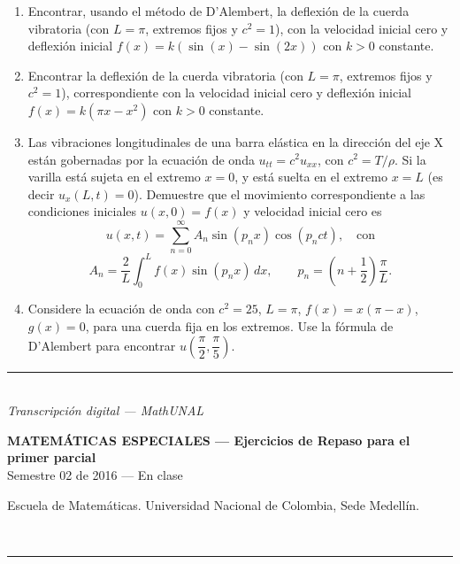 \documentclass[11pt]{article}
\newcommand{\examheader}[2]{%
  \noindent
  \begin{minipage}[t]{0.6\linewidth}
    {\small\bfseries MATEM\'ATICAS ESPECIALES --- #1}\\
    {\small #2}
  \end{minipage}%
  \hfill
  \begin{minipage}[t]{0.35\linewidth}
    \raggedleft\small Escuela de Matem\'aticas. Universidad Nacional de Colombia, Sede Medell\'in.
  \end{minipage}\\[2pt]
  \rule{\linewidth}{0.6pt}
}
\newcommand{\examfooter}{%
  \vfill
  \rule{\linewidth}{0.4pt}\\[1pt]
  {\scriptsize\textit{Transcripci\'on digital --- MathUNAL}\hfill\textcolor{unalblue}{\textbf{\thepage}}}
}
\begin{document}
\begin{enumerate}
\item Encontrar, usando el método de D'Alembert, la deflexión de la cuerda vibratoria (con $L=\pi$, extremos fijos y $c^2=1$), con la velocidad inicial cero y deflexión inicial $f(x) = k(\sin(x) - \sin(2x))$ con $k>0$ constante.

\item Encontrar la deflexión de la cuerda vibratoria (con $L=\pi$, extremos fijos y $c^2=1$), correspondiente con la velocidad inicial cero y deflexión inicial $f(x) = k(\pi x - x^2)$ con $k>0$ constante.

\item Las vibraciones longitudinales de una barra elástica en la dirección del eje X están gobernadas por la ecuación de onda $u_{tt} = c^2 u_{xx}$, con $c^2 = T/\rho$. Si la varilla está sujeta en el extremo $x=0$, y está suelta en el extremo $x=L$ (es decir $u_x(L,t)=0$). Demuestre que el movimiento correspondiente a las condiciones iniciales $u(x,0)=f(x)$ y velocidad inicial cero es
\[
u(x,t) = \sum_{n=0}^{\infty} A_n \sin(p_n x)\cos(p_n c t), \quad \text{con}
\]
\[
A_n = \frac{2}{L}\int_0^L f(x)\sin(p_n x)\,dx, \qquad p_n = \left(n+\frac{1}{2}\right)\frac{\pi}{L}.
\]

\item Considere la ecuación de onda con $c^2=25$, $L=\pi$, $f(x) = x(\pi-x)$, $g(x)=0$, para una cuerda fija en los extremos. Use la fórmula de D'Alembert para encontrar $u\left(\dfrac{\pi}{2},\dfrac{\pi}{5}\right)$.
\end{enumerate}

\examfooter
\newpage

\examheader{Ejercicios de Repaso para el primer parcial}{Semestre 02 de 2016 --- En clase}
\end{document}
